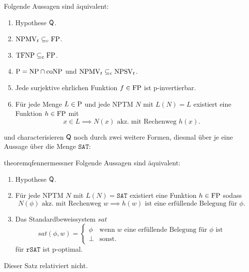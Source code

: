 \begin{theorem}\label{thm:q-orig}
    Folgende Aussagen sind äquivalent:
    \begin{enumerate}
        \item Hypothese $\hQ$.
        \item $\mathrm{NPMV}_t\subseteqc \mathrm{FP}$.
        \item $\TFNP\subseteqc \mathrm{FP}$.
        \item $\P=\NP\cap\coNP$ und $\mathrm{NPMV}_t\subseteqc \mathrm{NPSV}_t$.
        \item Jede surjektive ehrlichen Funktion $f\in\FP$ ist p-invertierbar.
        \item Für jede Menge $L\in \P$  und jede NPTM $N$ mit $L(N)=L$ existiert eine Funktion $h\in \FP$ mit 
            \[ x\in L \implies N(x) \text{ akz. mit Rechenweg $h(x)$}. \]
    \end{enumerate}
\end{theorem}

\textcite{fenner_inverting_2003} und \textcite{messner_simulation_2001} characterisieren $\hQ$ noch durch zwei weitere Formen, diesmal über je eine Aussage über die Menge $\mathtt{SAT}$:

\begin{restatable}{theorem}{qfennermessner}\label{thm:q-fenner-messner}
    Folgende Aussagen sind äquivalent:
    \begin{enumerate}
        \item Hypothese $\hQ$.
        \item \parencite{fenner_inverting_2003} Für jede NPTM $N$ mit $L(N)=\mathtt{SAT}$ existiert eine Funktion $h\in \FP$ sodass 
            \[ N(\phi) \text{ akz. mit Rechenweg $w$} \implies \text{$h(w)$ ist eine erfüllende Belegung für $\phi$.} \]
             
        \item \parencite{messner_simulation_2001} Das Standardbeweissystem $\mathit{sat}$
            \[ \mathit{sat}(\phi, w) = \begin{cases} \phi & \text{wenn $w$ eine erfüllende Belegung für $\phi$ ist} \\ \bot & \text{sonst.} \end{cases}\]
            für $\mathtt{rSAT}$ ist p-optimal.
    \end{enumerate}
    Dieser Satz relativiert nicht.
\end{restatable}

